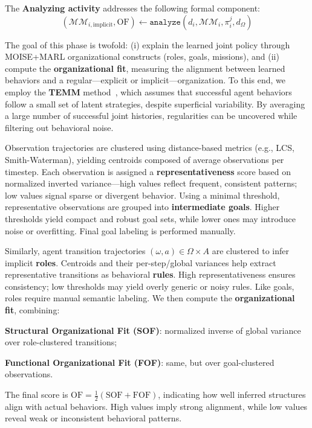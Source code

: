 \documentclass[pdflatex,sn-mathphys-num]{sn-jnl}%
\theoremstyle{thmstyleone}%
\theoremstyle{thmstyletwo}%
\theoremstyle{thmstylethree}%
\begin{document}
\noindent The \textbf{Analyzing activity} addresses the following formal component:
\[
    (\mathcal{MM}_{i,\text{implicit}}, \text{OF}) \gets \texttt{analyze}(d_i, \mathcal{MM}_i, \pi^j_i, d_\Omega)
\]

The goal of this phase is twofold: (i) explain the learned joint policy through MOISE+MARL organizational constructs (roles, goals, missions), and (ii) compute the \textbf{organizational fit}, measuring the alignment between learned behaviors and a regular—explicit or implicit—organization.
%
To this end, we employ the \textbf{TEMM} method~\cite{soule2025moisemarl}, which assumes that successful agent behaviors follow a small set of latent strategies, despite superficial variability. By averaging a large number of successful joint histories, regularities can be uncovered while filtering out behavioral noise.

Observation trajectories are clustered using distance-based metrics (e.g., LCS, Smith-Waterman), yielding centroids composed of average observations per timestep. Each observation is assigned a \textbf{representativeness} score based on normalized inverted variance—high values reflect frequent, consistent patterns; low values signal sparse or divergent behavior. Using a minimal threshold, representative observations are grouped into \textbf{intermediate goals}. Higher thresholds yield compact and robust goal sets, while lower ones may introduce noise or overfitting. Final goal labeling is performed manually.

Similarly, agent transition trajectories $(\omega, a) \in \Omega \times A$ are clustered to infer implicit \textbf{roles}. Centroids and their per-step/global variances help extract representative transitions as behavioral \textbf{rules}. High representativeness ensures consistency; low thresholds may yield overly generic or noisy rules. Like goals, roles require manual semantic labeling.
%
We then compute the \textbf{organizational fit}, combining:
\begin{enumerate*}[label={\roman*)}, itemjoin={; \quad}]
    \item \textbf{Structural Organizational Fit (SOF)}: normalized inverse of global variance over role-clustered transitions;
    \item \textbf{Functional Organizational Fit (FOF)}: same, but over goal-clustered observations.
\end{enumerate*}
%
The final score is $\text{OF} = \frac{1}{2}(\text{SOF} + \text{FOF})$, indicating how well inferred structures align with actual behaviors. High values imply strong alignment, while low values reveal weak or inconsistent behavioral patterns.
\end{document}
